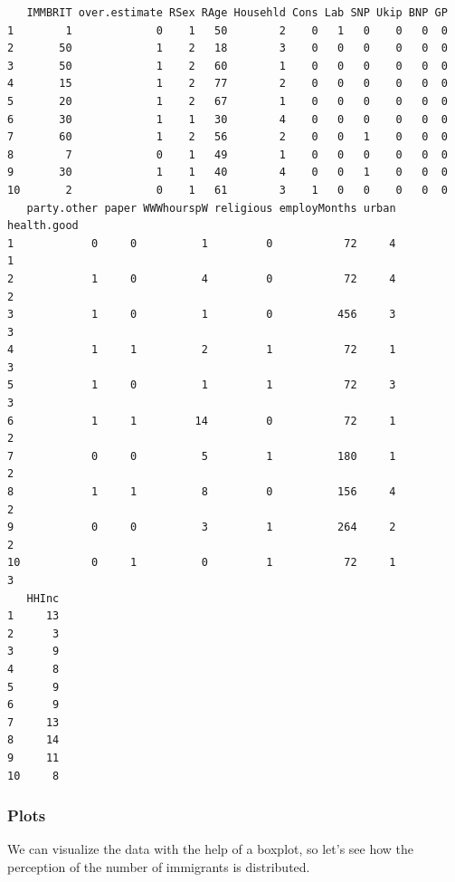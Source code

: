 \documentclass[]{article}
\newenvironment{Shaded}{\begin{snugshade}}{\end{snugshade}}
\newcommand{\KeywordTok}[1]{\textcolor[rgb]{0.13,0.29,0.53}{\textbf{#1}}}
\newcommand{\DataTypeTok}[1]{\textcolor[rgb]{0.13,0.29,0.53}{#1}}
\newcommand{\StringTok}[1]{\textcolor[rgb]{0.31,0.60,0.02}{#1}}
\newcommand{\CommentTok}[1]{\textcolor[rgb]{0.56,0.35,0.01}{\textit{#1}}}
\newcommand{\OtherTok}[1]{\textcolor[rgb]{0.56,0.35,0.01}{#1}}
\newcommand{\OperatorTok}[1]{\textcolor[rgb]{0.81,0.36,0.00}{\textbf{#1}}}
\newcommand{\NormalTok}[1]{#1}
\theoremstyle{definition}
\theoremstyle{definition}
\theoremstyle{definition}
\theoremstyle{remark}
\begin{document}
\begin{verbatim}
   IMMBRIT over.estimate RSex RAge Househld Cons Lab SNP Ukip BNP GP
1        1             0    1   50        2    0   1   0    0   0  0
2       50             1    2   18        3    0   0   0    0   0  0
3       50             1    2   60        1    0   0   0    0   0  0
4       15             1    2   77        2    0   0   0    0   0  0
5       20             1    2   67        1    0   0   0    0   0  0
6       30             1    1   30        4    0   0   0    0   0  0
7       60             1    2   56        2    0   0   1    0   0  0
8        7             0    1   49        1    0   0   0    0   0  0
9       30             1    1   40        4    0   0   1    0   0  0
10       2             0    1   61        3    1   0   0    0   0  0
   party.other paper WWWhourspW religious employMonths urban health.good
1            0     0          1         0           72     4           1
2            1     0          4         0           72     4           2
3            1     0          1         0          456     3           3
4            1     1          2         1           72     1           3
5            1     0          1         1           72     3           3
6            1     1         14         0           72     1           2
7            0     0          5         1          180     1           2
8            1     1          8         0          156     4           2
9            0     0          3         1          264     2           2
10           0     1          0         1           72     1           3
   HHInc
1     13
2      3
3      9
4      8
5      9
6      9
7     13
8     14
9     11
10     8
\end{verbatim}

\subsubsection{Plots}\label{plots}

We can visualize the data with the help of a boxplot, so let's see how
the perception of the number of immigrants is distributed.

\begin{Shaded}
\end{Shaded}
\end{document}

